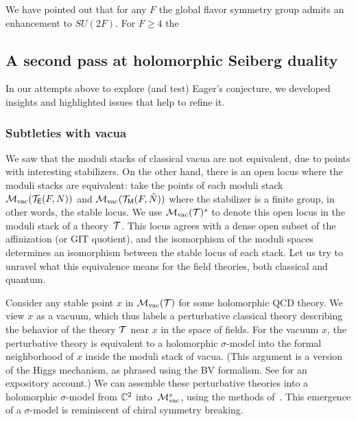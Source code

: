 \documentclass[11pt]{amsart}
\begin{document}
We have pointed out that for any $F$ the global flavor symmetry group admits an enhancement to $SU(2F)$. 
For $F \geq 4$ the 

%

\subsection{A second pass at holomorphic Seiberg duality}

In our attempts above to explore (and test) Eager's conjecture, we developed insights and highlighted issues that help to refine it.
 
\subsubsection{Subtleties with vacua}

We saw that the moduli stacks of classical vacua are not equivalent, due to points with interesting stabilizers.
On the other hand, there is an open locus where the moduli stacks are equivalent:
take the points of each moduli stack $\mathcal M_{\rm vac}(\mathcal T_{\mathsf E}(F,N))$ and $\mathcal M_{\rm vac}(\mathcal T_{{\sf M}}(F,\check{N}))$ where the stabilizer is a finite group,
in other words, the stable locus.
We use $\mathcal M_{\rm vac}(\mathcal T)^s$ to denote this open locus in the moduli stack of a theory~$\mathcal T$.
This locus agrees with a dense open subset of the affinization (or GIT quotient), 
and the isomorphism of the moduli spaces determines an isomorphism between the stable locus of each stack.
Let us try to unravel what this equivalence means for the field theories, both classical and quantum.

Consider any stable point $x$ in $\mathcal M_{\rm vac}(\mathcal T)$ for some holomorphic QCD theory.
We view $x$ as a vacuum, which thus labels a perturbative classical theory describing the behavior of the theory $\mathcal T$ near $x$ in the space of fields. 
For the vacuum $x$, the perturbative theory is equivalent to a holomorphic $\sigma$-model into the formal neighborhood of $x$ inside the moduli stack of vacua. 
(This argument is a version of the Higgs mechanism, as phrased using the BV formalism.
See \cite{EG} for an expository account.)
We can assemble these perturbative theories into a holomorphic $\sigma$-model from $\mathbb C^2$ into~$\mathcal M_{\rm vac}^{s}$,
using the methods of~\cite{GGW, WilThesis}.
This emergence of a $\sigma$-model is reminiscent of chiral symmetry breaking.
\end{document}
